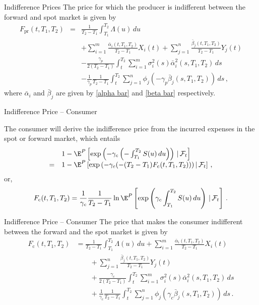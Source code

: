{Indifference Prices}
The price for which the producer is indifferent between the forward
and spot market is given by
\begin{eqnarray*}
F_{\text{pr}}(t,T_1,T_2)&=&\frac{1}{T_2-T_1}\int_{T_1}^{T_2}\Lambda(u)\,du\\
&&+\sum_{i=1}^m\frac{\bar{\alpha}_i(t,T_1,T_2)}{T_2-T_1}X_i(t)+\sum_{j=1}^n
\frac{\bar{\beta}_j(t,T_1,T_2)}{T_2-T_1}Y_j(t) \\
&&-\frac{\gamma_p}{2(T_2-T_1)}\int_t^{T_2}\sum_{i=1}^m
\sigma_i^2(s)\bar{\alpha}_i^2(s,T_1,T_2)\,ds
\\&&-\frac1{\gamma_p}\frac1{T_2-T_1}\int_t^{T_2}\sum_{j=1}^n
\phi_j\left(-\gamma_p\bar{\beta}_j(s,T_1,T_2)\right)\,ds\,,
\end{eqnarray*}
where $ \bar{\alpha}_i$ and $\bar{\beta}_j$ are given by
\eqref{alpha bar} and \eqref{beta bar} respectively.



{Indifference Price -- Consumer}

The consumer will derive the indifference price from the incurred expenses
in the spot or forward market, which entails
$$
\begin{array}{ll}
&1-\E^P\left[\exp\left(-\gamma_c\left(-\int_{T_1}^{T_2}S(u)\,du\right)\right)
\,|\,\mathcal{F}_t\right]\\
= &1-\E^P\left[\exp\left(-\gamma_c(-(T_2-T_1)F_{\text{c}}(t,T_1,T_2)\right))\,|\,
\mathcal{F}_t\right]\,,
\end{array}
$$
or,
\begin{equation}
F_{\text{c}}(t,T_1,T_2)=\frac1{\gamma_c}\frac1{T_2-T_1}\ln\E^P\left[
\exp\left(\gamma_c\int_{T_1}^{T_2}S(u)\,du\right)\,|\,\mathcal{F}_t\right]\,.
\end{equation}

{Indifference Price -- Consumer}
The price that makes the consumer indifferent between the forward
and the spot market is given by
\begin{align*}
F_{\text{c}}(t,T_1,T_2)&=\frac1{T_2-T_1}\int_{T_1}^{T_2}\Lambda(u)\,du
+\sum_{i=1}^m\frac{\bar{\alpha}_i(t,T_1,T_2)}{T_2-T_1}X_i(t)\\
&\qquad+\sum_{j=1}^n\frac{\bar{\beta}_j(t,T_1,T_2)}{T_2-T_1}Y_j(t) \\
&\qquad+\frac{\gamma_c}{2(T_2-T_1)}\int_t^{T_2}
\sum_{i=1}^m\sigma_i^2(s)\bar{\alpha}_i^2(s,T_1,T_2)\,ds \\
&\qquad+\frac1{\gamma_c}\frac1{T_2-T_1}\int_t^{T_2}\sum_{j=1}^n
\phi_j\left(\gamma_c\bar{\beta}_j(s,T_1,T_2)\right)\,ds\,.
\end{align*}

